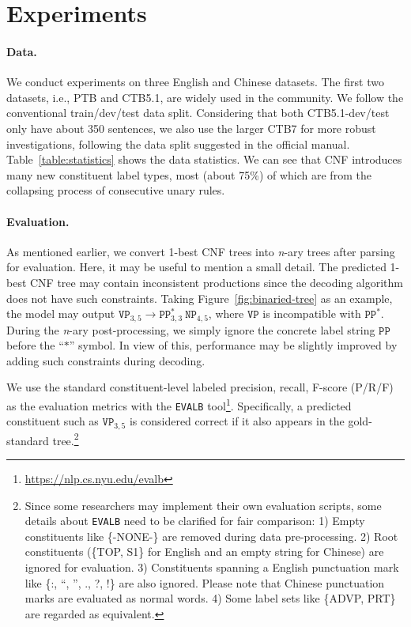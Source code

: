 \documentclass{article}
\begin{document}
\section{Experiments}
\label{section:experiments}
\paragraph{Data.}
We conduct experiments on three English and Chinese datasets.
The first two datasets, i.e., PTB and CTB5.1, are widely used in the community.
We follow the conventional train/dev/test data split.
Considering that both CTB5.1-dev/test only have about 350 sentences,
we also use the larger CTB7 for more robust investigations, following the data split suggested in the official manual.
Table~\ref{table:statistics} shows the data statistics.
We can see that CNF introduces many new constituent label types,  most (about 75\%) of which are from the collapsing process of consecutive unary rules.





\paragraph{Evaluation.}
As mentioned earlier, we convert 1-best CNF trees into \textit{n}-ary trees after parsing for evaluation.
Here, it may be useful to mention a small detail.
The predicted 1-best CNF tree may contain inconsistent productions since the decoding algorithm does not have such constraints.
Taking Figure~\ref{fig:binaried-tree} as an example, the model may output $\texttt{VP}_{3,5} \rightarrow \texttt{PP}^{\ast}_{3,3} ~ \texttt{NP}_{4,5}$, where $\texttt{VP}$ is incompatible with $\texttt{PP}^{\ast}$.
During the \textit{n}-ary post-processing, we simply ignore the concrete label string $\texttt{PP}$ before the ``$\mathtt{\ast}$'' symbol.
In view of this, performance may be slightly improved by adding such constraints during decoding.

We use the standard constituent-level labeled precision, recall, F-score (P/R/F) as the evaluation metrics with the \texttt{EVALB} tool\footnote{\url{https://nlp.cs.nyu.edu/evalb}}.
Specifically, a predicted constituent such as $\texttt{VP}_{3,5}$ is considered correct if it also appears in the gold-standard tree.\footnote{
Since some researchers may implement their own evaluation scripts, some details about \texttt{EVALB} need to be clarified for fair comparison:
1) Empty constituents like \{-NONE-\} are removed during data pre-processing.
2) Root constituents (\{TOP, S1\} for English and an empty string for Chinese) are ignored for evaluation.
3) Constituents spanning a English punctuation mark like \{:, ``, '', ., ?, !\} are also ignored. Please note that Chinese punctuation marks are evaluated as normal words.
4) Some label sets like \{ADVP, PRT\} are regarded as equivalent.}
\end{document}
